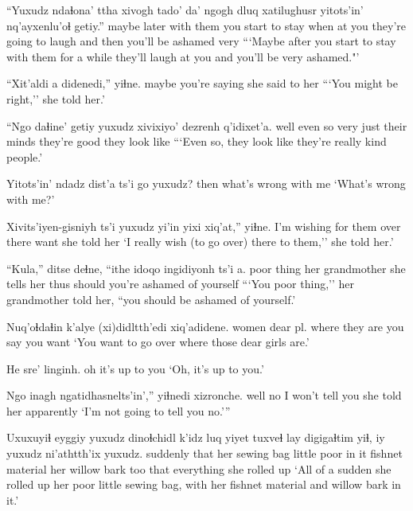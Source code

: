 \documentclass[12pt]{article}
\begin{document}
\gll ``Yuxudz ndaɬona' ttha          xivogh    tado'                 da' ngogh {dluq xatilughusr}        {yitots'in'} nq'ayxenlu'oɬ   getiy.''
{}     maybe    later {with them} {you start to stay} when {at you} {they're going to laugh} {and then}  {you'll be ashamed} very
\glt ```Maybe after you start to stay with them for a while they'll laugh at you and you'll be very ashamed."'
\glend

\gll ``Xit'aldi a didenedi,'' yiɬne.
maybe   {}    {you're saying}    {she said to her}
\glt ```You might be right,'' she told her.'
\glend

\gll ``Ngo  daɬine' getiy yuxudz xivixiyo'   dezrenh      q'idixet'a.
well   {even so} very  just  {their minds} {they're good} {they look like}
\glt ```Even so, they look like they're really kind people.'
\glend

\gll Yitots'in' {ndadz dist'a} ts'i    go yuxudz?
then       {what's wrong with me}
\glt `What's wrong with me?'
\glend

\gll Xivits'iyen-gisniyh ts'i yuxudz yi'in yixi xiq'at,'' yiɬne.
{I'm wishing for them} {} {} over  there want   {she told her }
\glt `I really wish (to go over) there to them,'' she told her.'
\glend

\gll ``Kula,''       ditse           deɬne, ``ithe   {idoqo ingidiyonh}          ts'i a.
{poor thing} {her grandmother} {she tells her thus} should {you're ashamed of yourself}
\glt ```You poor thing,'' her grandmother told her, ``you should be ashamed of yourself.'
\glend

\gll Nuq'oɬdaɬin k'alye  (xi)didltth'edi    xiq'adidene. 
women       {dear pl.} {where they are}  {you say you want}
\glt `You want to go over where those dear girls are.'
\glend

\gll He {{sre' linginh.}}
oh {{it's up to you}}
\glt `Oh, it's up to you.'
\glend

\gll Ngo  inagh {ngatidhasnelts'in',''} yiɬnedi xizronche.
well no    {I won't tell you}    {she told her} apparently
\glt `I'm not going to tell you no.'''
\glend

\gll Uxuxuyiɬ eyggiy yuxudz dinoɬchidl     k'idz  luq   yiyet tuxveɬ lay       digigaɬtim      yiɬ, iy   yuxudz     ni'athtth'ix     yuxudz. 
suddenly    that   {}     {her sewing bag} little poor  {in it} fishnet material {her willow bark} too that everything {she rolled up}
\glt `All of a sudden she rolled up her poor little sewing bag, with her fishnet material and willow bark in it.'
\glend
\end{document}
